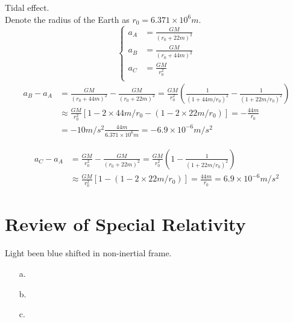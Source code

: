 \documentclass[11pt,fleqn]{book} %
\begin{document}
\begin{problem}
	Tidal effect.\\
	Denote the radius of the Earth as $r_0 = 6.371 \times 10^6 m$.
	\begin{equation}
		\begin{cases}
			a_A &= \frac{GM}{(r_0 + 22m)^2}\\
			a_B &= \frac{GM}{(r_0 + 44m)^2}\\
			a_C &= \frac{GM}{r_0^2}\\
		\end{cases}
	\end{equation}
\begin{equation}
	\begin{split}
	a_B - a_A &= \frac{GM}{(r_0 + 44m)^2} - \frac{GM}{(r_0 + 22m)^2} = \frac{GM}{r_0^2} (\frac{1}{(1 + 44m/r_0)^2} - \frac{1}{(1 + 22m/r_0)^2}) \\
	& \approx \frac{GM}{r_0^2} [1 - 2 \times 44m/r_0 - (1 - 2 \times 22m/r_0)] = - \frac{44m}{r_0}\\
	& = - 10m/s^2 \frac{44m}{6.371 \times 10^6 m} = -6.9\times 10^{-6} m/s^2
	\end{split}
\end{equation}

\begin{equation}
	\begin{split}
		a_C - a_A &= \frac{GM}{r_0^2} - \frac{GM}{(r_0 + 22m)^2} = \frac{GM}{r_0^2} (1 - \frac{1}{(1 + 22m/r_0)^2}) \\
		& \approx \frac{GM}{r_0^2} [1  - (1 - 2 \times 22m/r_0)] =  \frac{44m}{r_0} = 6.9\times 10^{-6} m/s^2
	\end{split}
\end{equation}
\end{problem}



\chapter{Review of Special Relativity}
\begin{problem}
	Light been blue shifted in non-inertial frame.\\
	\begin{enumerate}
		\item[a.]
		
		\item[b.] 
		
		\item[c.] 
	\end{enumerate}
\end{problem}
\end{document}
